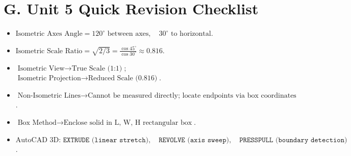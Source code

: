 \section{G. Unit 5 Quick Revision Checklist}
\begin{revisionchecklist}
\begin{itemize}
    \item $\text{Isometric Axes Angle} = 120^\circ \text{ between axes}, \quad 30^\circ \text{ to horizontal}$.
    \item $\text{Isometric Scale Ratio} = \sqrt{2/3} = \frac{\cos 45^\circ}{\cos 30^\circ} \approx 0.816$.
    \item $\text{Isometric View} \to \text{True Scale (1:1)}$; $\text{Isometric Projection} \to \text{Reduced Scale (0.816)}$.
    \item $\text{Non-Isometric Lines} \to \text{Cannot be measured directly; locate endpoints via box coordinates}$.
    \item $\text{Box Method} \to \text{Enclose solid in L, W, H rectangular box}$.
    \item $\text{AutoCAD 3D: } \texttt{EXTRUDE (linear stretch)}, \quad \texttt{REVOLVE (axis sweep)}, \quad \texttt{PRESSPULL (boundary detection)}$.
\end{itemize}
\end{revisionchecklist}
